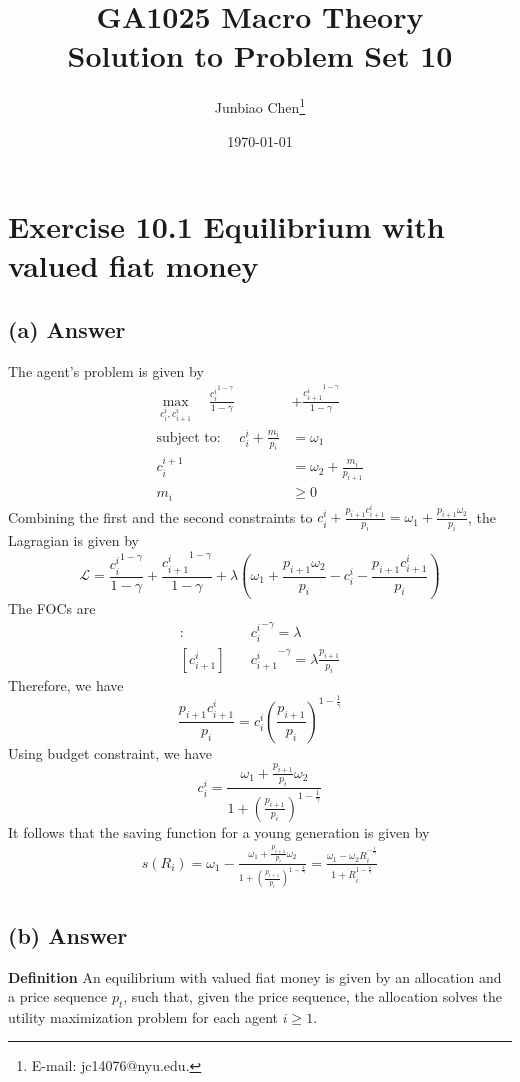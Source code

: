 \documentclass[11pt]{article}
\title{GA1025 Macro Theory \\Solution to Problem Set 10}
\author{
Junbiao Chen\thanks{E-mail: jc14076@nyu.edu.}
}
\date{\today}
\theoremstyle{definition}
\theoremstyle{boldtitle} %
\numberwithin{equation}{section}
\numberwithin{figure}{section}
\numberwithin{table}{section}
\begin{document}
\maketitle

\section{Exercise 10.1 Equilibrium with valued fiat money}
\subsection{(a) Answer}
The agent's problem is given by 
\begin{align*}
    \max_{c_i^i, c_{i+1}^i} \quad \frac{{c^i_i}^{1-\gamma}}{1 - \gamma} & + \frac{{c^i_{i+1}}^{1-\gamma}}{1 - \gamma} \\ 
    \text{subject to: } \quad c_i^i + \frac{m_i}{p_i} & = \omega_1 \\ 
    c_i^{i+1}  & = \omega_2 + \frac{m_i}{p_{i+1}} \\ 
    m_i & \geq 0
\end{align*}
Combining the first and the second constraints to 
$c_i^i + \frac{p_{i+1} c^i_{i+1}}{p_i} = \omega_1 + \frac{p_{i+1} \omega_2}{p_i} $, 
the Lagragian is given by 
\[
\mathcal{L} = \frac{{c^i_i}^{1-\gamma}}{1 - \gamma} + \frac{{c^i_{i+1}}^{1-\gamma}}{1 - \gamma} 
+ \lambda \left(\omega_1 + \frac{p_{i+1} \omega_2}{p_i} - c_i^i - \frac{p_{i+1} c^i_{i+1}}{p_i} \right)
\]
The FOCs are
\begin{align*}
    [{c^i_i}]: \quad & {c^i_i}^{-\gamma} = \lambda \\
    [c^i_{i+1}] \quad & {c^i_{i+1}}^{-\gamma} = \lambda \frac{p_{i+1}}{p_i} 
\end{align*}
Therefore, we have 
\[
\frac{p_{i+1} c^i_{i+1}}{p_i} = {c^i_{i}} \left(\frac{p_{i+1}}{p_i} \right)^{1-\frac{1}{\gamma}}
\]
Using budget constraint, we have 
\[
c^i_i = \frac{\omega_1 + \frac{p_{i+1}}{p_i} \omega_2}{1 + \left(\frac{p_{i+1}}{p_i} \right)^{1-\frac{1}{\gamma}}}
\]
It follows that the saving function for a young generation is given by 
\begin{align*}
s(R_i) = \omega_1 - \frac{\omega_1 + \frac{p_{i+1}}{p_i} \omega_2}{1 + \left(\frac{p_{i+1}}{p_i} \right)^{1-\frac{1}{\gamma}}} 
= \frac{\omega_1 - \omega_2 R_i^{-\frac{1}{\gamma}}}{1 + R_i^{1 - \frac{1}{\gamma}}}
\end{align*}


\subsection{(b) Answer}
\textbf{Definition}
An equilibrium with valued fiat money is given by an allocation and a price sequence $p_t$,
such that, 
given the price sequence, the allocation solves the utility maximization problem for each agent $i \geq 1$.
\end{document}
